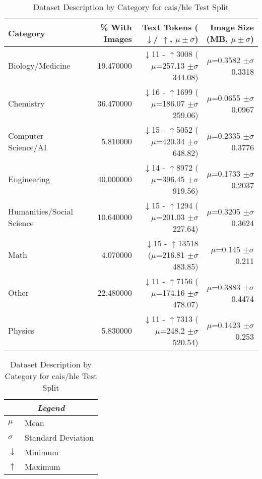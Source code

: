 \begin{table}[H]
\centering
\begin{tabular}{lrrr}
\toprule
Category & \% With Images & Text Tokens ($\downarrow$/ $\uparrow$, $\mu \pm \sigma$) & Image Size (MB, $\mu \pm \sigma$) \\
\midrule
Biology/Medicine & 19.470000 & $\downarrow$11 - $\uparrow$3008 ($\mu$=257.13 $\pm\sigma$344.08) & $\mu$=0.3582 $\pm\sigma$0.3318 \\
Chemistry & 36.470000 & $\downarrow$16 - $\uparrow$1699 ($\mu$=186.07 $\pm\sigma$259.06) & $\mu$=0.0655 $\pm\sigma$0.0967 \\
Computer Science/AI & 5.810000 & $\downarrow$15 - $\uparrow$5052 ($\mu$=420.34 $\pm\sigma$648.82) & $\mu$=0.2335 $\pm\sigma$0.3776 \\
Engineering & 40.000000 & $\downarrow$14 - $\uparrow$8972 ($\mu$=396.45 $\pm\sigma$919.56) & $\mu$=0.1733 $\pm\sigma$0.2037 \\
Humanities/Social Science & 10.640000 & $\downarrow$15 - $\uparrow$1294 ($\mu$=201.03 $\pm\sigma$227.64) & $\mu$=0.3205 $\pm\sigma$0.3624 \\
Math & 4.070000 & $\downarrow$15 - $\uparrow$13518 ($\mu$=216.81 $\pm\sigma$483.85) & $\mu$=0.145 $\pm\sigma$0.211 \\
Other & 22.480000 & $\downarrow$11 - $\uparrow$7156 ($\mu$=174.16 $\pm\sigma$478.07) & $\mu$=0.3883 $\pm\sigma$0.4474 \\
Physics & 5.830000 & $\downarrow$11 - $\uparrow$7313 ($\mu$=248.2 $\pm\sigma$520.54) & $\mu$=0.1423 $\pm\sigma$0.253 \\
\bottomrule
\end{tabular}
\caption{Dataset Description by Category for cais/hle Test Split}
\label{tab:dataset_description}
\vspace{0.5em}
\begin{tabular}{ll}
\multicolumn{2}{c}{\textit{Legend}} \\ \hline
$\mu$ & Mean \\ 
$\sigma$ & Standard Deviation \\ 
$\downarrow$ & Minimum \\ 
$\uparrow$ & Maximum \\ 
\end{tabular}
\end{table}
